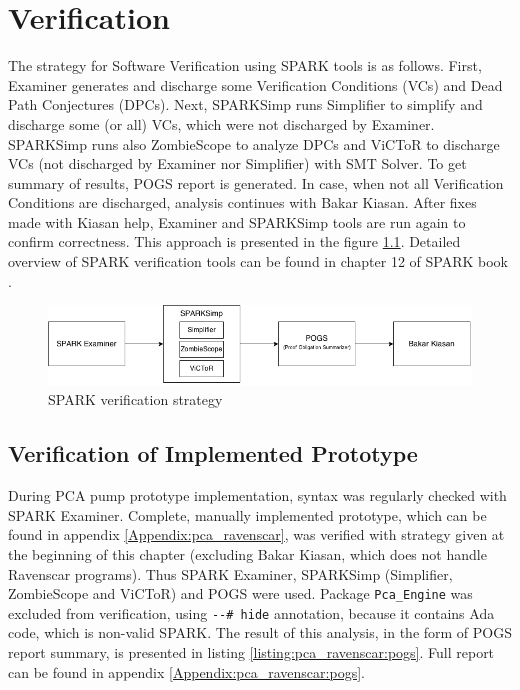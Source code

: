 
\cleardoublepage

\chapter{Verification}
\label{verification}


The strategy for Software Verification using SPARK tools is as follows. First, Examiner generates and discharge some Verification Conditions (VCs) and Dead Path Conjectures (DPCs). Next, SPARKSimp runs Simplifier to simplify and discharge some (or all) VCs, which were not discharged by Examiner. SPARKSimp runs also ZombieScope to analyze DPCs and ViCToR to discharge VCs (not discharged by Examiner nor Simplifier) with SMT Solver. To get summary of results, POGS report is generated. In case, when not all Verification Conditions are discharged, analysis continues with Bakar Kiasan. After fixes made with Kiasan help, Examiner and SPARKSimp tools are run again to confirm correctness. This approach is presented in the figure \ref{figure:sparkverificationstrategy}. Detailed overview of SPARK verification tools can be found in chapter 12 of SPARK book \cite{Barnes:Book}.

\begin{figure}[ht]%
    \begin{center}
        \includegraphics[width=1.0\textwidth]{figures/spark-verification.png}        
    \end{center}
    \caption{SPARK verification strategy}
    \label{figure:sparkverificationstrategy}
\end{figure}

\section{Verification of Implemented Prototype}
\label{verification:prototype}

During PCA pump prototype implementation, syntax was regularly checked with SPARK Examiner. Complete, manually implemented prototype, which can be found in appendix \ref{Appendix:pca_ravenscar}, was verified with strategy given at the beginning of this chapter (excluding Bakar Kiasan, which does not handle Ravenscar programs). Thus SPARK Examiner, SPARKSimp (Simplifier, ZombieScope and ViCToR) and POGS were used. Package \lstinline{Pca_Engine} was excluded from verification, using \lstinline{--# hide} annotation, because it contains Ada code, which is non-valid SPARK. The result of this analysis, in the form of POGS report summary, is presented in listing \ref{listing:pca_ravenscar:pogs}. Full report can be found in appendix \ref{Appendix:pca_ravenscar:pogs}.

